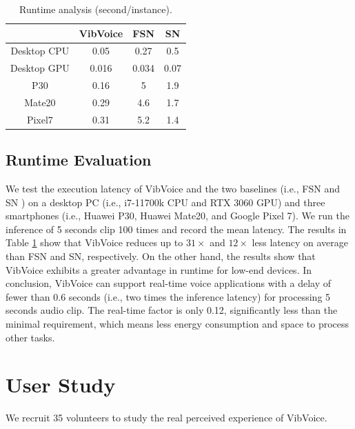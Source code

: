 \begin{table}
\centering
\begin{tabular}{cccc}\toprule
& VibVoice & FSN & SN \\ \midrule
Desktop CPU    & 0.05 &0.27  & 0.5 \\ 
Desktop GPU    & 0.016&0.034 & 0.07\\ 
P30    & 0.16 &5     & 1.9 \\ 
Mate20 & 0.29 &4.6   & 1.7\\ 
Pixel7 & 0.31 &5.2   & 1.4\\ \bottomrule
\end{tabular}
\caption{\label{table4}Runtime analysis (second/instance).}
\end{table}

\subsection{Runtime Evaluation}
\label{sec:vibvoice_runtime}
We test the execution latency of VibVoice and the two baselines (i.e., FSN \citep{hao2021fullsubnet} and SN \citep{tagliasacchi2020seanet}) on a desktop PC (i.e., i7-11700k CPU and RTX 3060 GPU) and three smartphones (i.e., Huawei P30, Huawei Mate20, and Google Pixel 7). We run the inference of 5 seconds clip 100 times and record the mean latency. 
The results in Table \ref{table4} show that VibVoice reduces up to $31\times$ and $12\times$ less latency on average than FSN and SN, respectively. On the other hand, the results show that VibVoice exhibits a greater advantage in runtime for low-end devices.
In conclusion, VibVoice can support real-time voice applications with a delay of fewer than 0.6 seconds (i.e., two times the inference latency) for processing 5 seconds audio clip. The real-time factor is only 0.12, significantly less than the minimal requirement, which means less energy consumption and space to process other tasks.

\section{User Study}
\label{sec:vibvoice_user-study}
We recruit 35 volunteers to study the real perceived experience of VibVoice.

